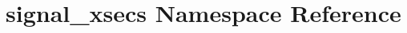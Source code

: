 \hypertarget{namespacesignal__xsecs}{
\section{signal\_\-xsecs Namespace Reference}
\label{namespacesignal__xsecs}
}
